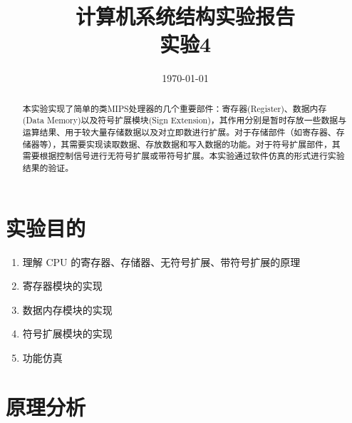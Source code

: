 \documentclass[UTF8]{ctexart}
\title{计算机系统结构实验报告\\实验4}
\date{\today}
\begin{document}
\maketitle
\begin{abstract}
    本实验实现了简单的类MIPS处理器的几个重要部件：寄存器(Register)、数据内存(Data Memory)以及符号扩展模块(Sign Extension)，其作用分别是暂时存放一些数据与运算结果、用于较大量存储数据以及对立即数进行扩展。对于存储部件（如寄存器、存储器等），其需要实现读取数据、存放数据和写入数据的功能。对于符号扩展部件，其需要根据控制信号进行无符号扩展或带符号扩展。本实验通过软件仿真的形式进行实验结果的验证。
  \end{abstract}  
\tableofcontents
\clearpage
\section{实验目的}
\begin{enumerate}
    \item 理解 CPU 的寄存器、存储器、无符号扩展、带符号扩展的原理
    \item 寄存器模块的实现
    \item 数据内存模块的实现
    \item 符号扩展模块的实现
    \item 功能仿真
\end{enumerate}
\section{原理分析}
\end{document}
